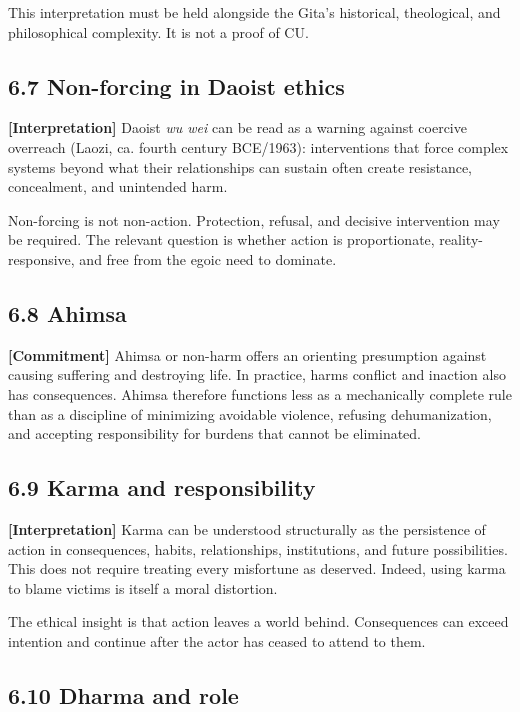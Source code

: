 \documentclass[
  11pt,
]{article}
\begin{document}
This interpretation must be held alongside the Gita's historical,
theological, and philosophical complexity. It is not a proof of CU.

\subsection{6.7 Non-forcing in Daoist
ethics}\label{non-forcing-in-daoist-ethics}

\textbf{{[}Interpretation{]}} Daoist \emph{wu wei} can be read as a
warning against coercive overreach (Laozi, ca. fourth century BCE/1963):
interventions that force complex systems beyond what their relationships
can sustain often create resistance, concealment, and unintended harm.

Non-forcing is not non-action. Protection, refusal, and decisive
intervention may be required. The relevant question is whether action is
proportionate, reality-responsive, and free from the egoic need to
dominate.

\subsection{6.8 Ahimsa}\label{ahimsa}

\textbf{{[}Commitment{]}} Ahimsa or non-harm offers an orienting
presumption against causing suffering and destroying life. In practice,
harms conflict and inaction also has consequences. Ahimsa therefore
functions less as a mechanically complete rule than as a discipline of
minimizing avoidable violence, refusing dehumanization, and accepting
responsibility for burdens that cannot be eliminated.

\subsection{6.9 Karma and
responsibility}\label{karma-and-responsibility}

\textbf{{[}Interpretation{]}} Karma can be understood structurally as
the persistence of action in consequences, habits, relationships,
institutions, and future possibilities. This does not require treating
every misfortune as deserved. Indeed, using karma to blame victims is
itself a moral distortion.

The ethical insight is that action leaves a world behind. Consequences
can exceed intention and continue after the actor has ceased to attend
to them.

\subsection{6.10 Dharma and role}\label{dharma-and-role}
\end{document}
